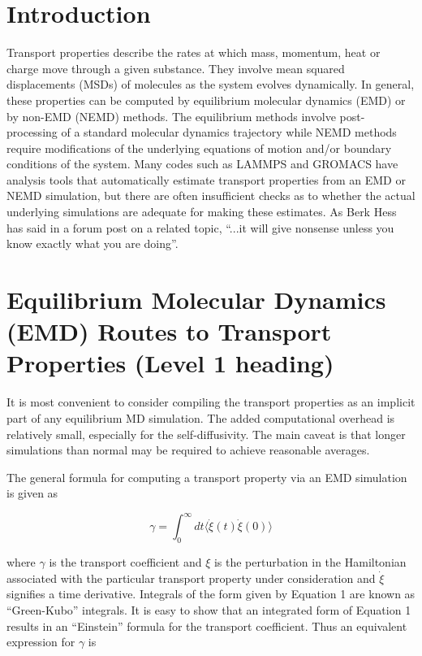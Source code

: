 \documentclass[9pt]{livecoms}
\begin{document}
\section{Introduction}

Transport properties describe the rates at which mass, momentum, heat or charge move through a given substance. They involve mean squared displacements (MSDs) of molecules as the system evolves dynamically. In general, these properties can be computed by equilibrium molecular dynamics (EMD) or by non-EMD (NEMD) methods. The equilibrium methods involve post-processing of a standard molecular dynamics trajectory while NEMD methods require modifications of the underlying equations of motion and/or boundary conditions of the system. Many codes such as LAMMPS and GROMACS have analysis tools that automatically estimate transport properties from an EMD or NEMD simulation, but there are often insufficient checks as to whether the actual underlying simulations are adequate for making these estimates. As Berk Hess has said in a forum post on a related topic, ``...it will give nonsense unless you know exactly what you are doing''. %

\section{Equilibrium Molecular Dynamics (EMD) Routes to Transport Properties (Level 1 heading)}

It is most convenient to consider compiling the transport properties as an implicit part of any equilibrium MD simulation. The added computational overhead is relatively small, especially for the self-diffusivity. The main caveat is that longer simulations than normal may be required to achieve reasonable averages. 

The general formula for computing a transport property via an EMD simulation is given as

\begin{equation}
\gamma = \int_{0}^{\infty}dt\langle\dot{\xi}(t)\dot{\xi}(0)\rangle
\end{equation}

where $\gamma$ is the transport coefficient and $\xi$ is the perturbation in the Hamiltonian associated with the particular transport property under consideration and $\dot{\xi}$ signifies a time derivative. Integrals of the form given by Equation 1 are known as “Green-Kubo” integrals. It is easy to show that an integrated form of Equation 1 results in an “Einstein” formula for the transport coefficient. Thus an equivalent expression for $\gamma$ is
\end{document}
